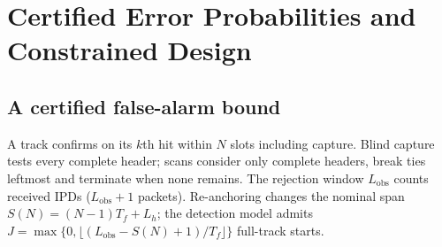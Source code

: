 \documentclass[journal]{IEEEtran}
\newcommand{\Tf}{T_f}
\newcommand{\Lobs}{L_{\mathrm{obs}}}
\newcommand{\Lh}{L_h}
\begin{document}
\section{Certified Error Probabilities and Constrained Design}
\label{sec:design}
\subsection{A certified false-alarm bound}
A track confirms on its $k$th hit within $N$ slots including capture. Blind capture tests every complete header; scans consider only complete headers, break ties leftmost and terminate when none remains. The rejection window $\Lobs$ counts received IPDs ($\Lobs+1$ packets). Re-anchoring changes the nominal span $S(N)=(N-1)\Tf+\Lh$; the detection model admits $J=\max\{0,\lfloor(\Lobs-S(N)+1)/\Tf\rfloor\}$ full-track starts.
\end{document}
